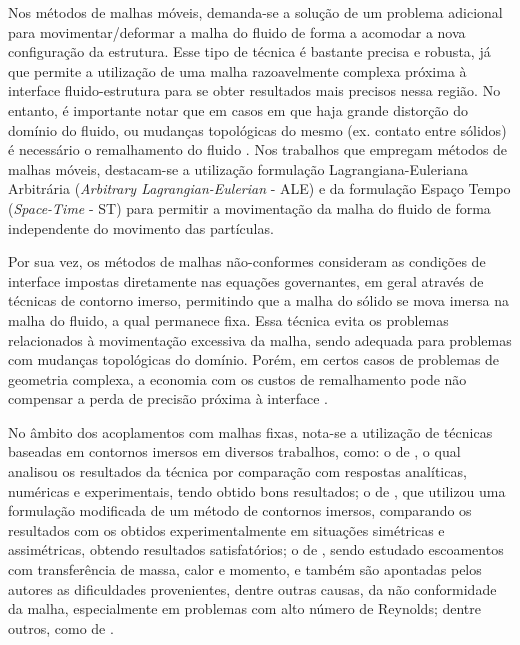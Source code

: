 Nos métodos de malhas móveis, demanda-se a solução de um problema adicional para movimentar/deformar a malha do fluido de forma a acomodar a nova configuração da estrutura. Esse tipo de técnica é bastante precisa e robusta, já que permite a utilização de uma malha razoavelmente complexa próxima à interface fluido-estrutura para se obter resultados mais precisos nessa região. No entanto, é importante notar que em casos em que haja grande distorção do domínio do fluido, ou mudanças topológicas do mesmo (ex. contato entre sólidos) é necessário o remalhamento do fluido \cite{terahara2020heart}.  Nos trabalhos que empregam métodos de malhas móveis, destacam-se a utilização formulação Lagrangiana-Euleriana Arbitrária (\textit{Arbitrary Lagrangian-Eulerian} - ALE) \cite{donea1982arbitrary,kanchi20073d,fernandes2019ale} e da formulação Espaço Tempo (\textit{Space-Time} - ST) \cite{takizawa2011multiscale,terahara2020heart,takizawa2011stabilized} para permitir a movimentação da malha do fluido de forma independente do movimento das partículas.

Por sua vez, os métodos de malhas não-conformes consideram as condições de interface impostas diretamente nas equações governantes, em geral através de técnicas de contorno imerso, permitindo que a malha do sólido se mova imersa na malha do fluido, a qual permanece fixa. Essa técnica evita os problemas relacionados à movimentação excessiva da malha, sendo adequada para problemas com mudanças topológicas do domínio. Porém, em certos casos de problemas de geometria complexa, a economia com os custos de remalhamento pode não compensar a perda de precisão próxima à interface \cite{bazilevs2013computational,hou2012numerical,bazilevs2015ale}.

No âmbito dos acoplamentos com malhas fixas, nota-se a utilização de técnicas baseadas em contornos imersos em diversos trabalhos, como: o de , o qual analisou os resultados da técnica por comparação com respostas analíticas, numéricas e experimentais, tendo obtido bons resultados; o de , que utilizou uma formulação modificada de um método de contornos imersos, comparando os resultados com os obtidos experimentalmente em situações simétricas e assimétricas, obtendo resultados satisfatórios; o de , sendo estudado escoamentos com transferência de massa, calor e momento, e também são apontadas pelos autores as dificuldades provenientes, dentre outras causas, da não conformidade da malha, especialmente em problemas com alto número de Reynolds; dentre outros, como de .

